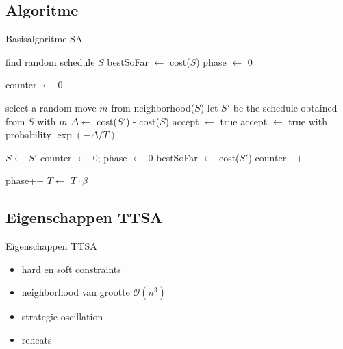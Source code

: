 \documentclass{beamer}
\begin{document}
\subsection*{Algoritme}
\begin{frame}{Basisalgoritme SA}

\begin{algorithm}[H]\tiny
find random schedule $S$\;
bestSoFar $\leftarrow$ cost($S$)\;
phase $\leftarrow$ 0\;
{
 	counter $\leftarrow$ 0\;
	{
 		select a random move $m$ from neighborhood($S$)\;
 		let $S'$ be the schedule obtained from $S$ with $m$\;
		$\Delta{} \leftarrow$ cost($S'$) - cost($S$)\;
 			{
 			accept $\leftarrow$ true\; 
 			}
 			{
 			accept $\leftarrow$ true with probability $\exp{(-\Delta{}/T)}$\;
 			}

			{
 			$S \leftarrow\ S'$\;
				{
 				counter $\leftarrow$ 0; phase $\leftarrow$ 0\;
 				bestSoFar $\leftarrow$ cost($S'$)\;
				}
				{
 				counter$++$\;
				}
			}
 		
		phase++\;
	$T \leftarrow$ $T\cdot\beta$\;
	}
}
\end{algorithm}

\end{frame}





\subsection*{Eigenschappen TTSA}
\begin{frame}{Eigenschappen TTSA} 
\begin{itemize}
\item<1-> hard en soft constraints
\item<2-> neighborhood van grootte $\mathcal{O}(n^3)$
\item<3-> strategic oscillation
\item<4-> reheats
\end{itemize}
\end{frame}
\end{document}
